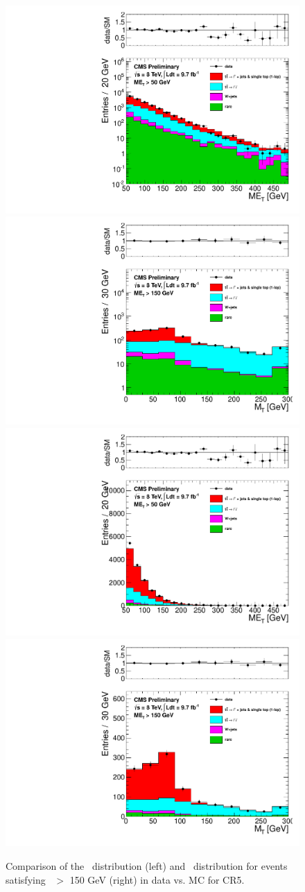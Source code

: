 \begin{figure}[hbt]
  \begin{center}
        \includegraphics[width=0.5\linewidth]{plots/pas_log/met_met50_nj4_emucomb_CR5.pdf}%
        \includegraphics[width=0.5\linewidth]{plots/pas_log/mt_met150_nj4_emucomb_CR5.pdf}
        \includegraphics[width=0.5\linewidth]{plots/pas_lin/met_met50_nj4_emucomb_CR5.pdf}%
        \includegraphics[width=0.5\linewidth]{plots/pas_lin/mt_met150_nj4_emucomb_CR5.pdf}
    \caption{
Comparison of the \met\ distribution (left) and \mt\ distribution for events satisfying \met\ $>$ 150 GeV (right)
in data vs. MC for CR5. 
\label{fig:cr5met} 
}  
      \end{center}
\end{figure}

